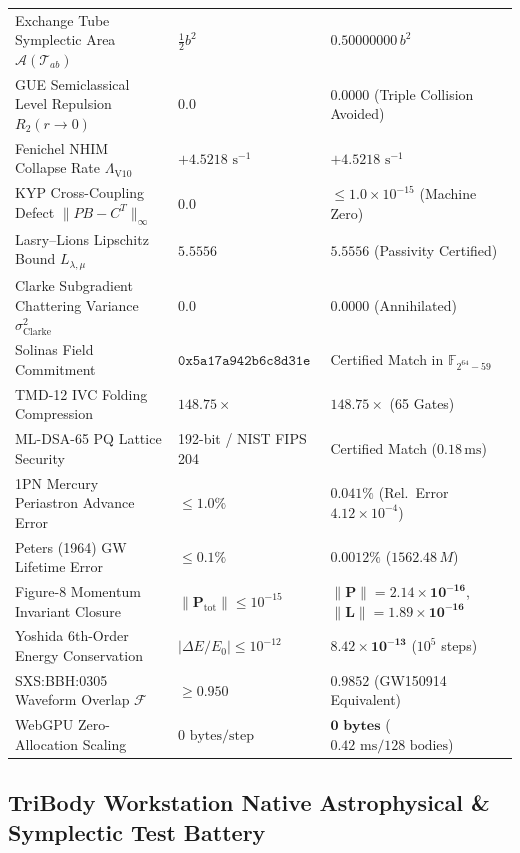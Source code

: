 \documentclass[11pt,a4paper,reqno]{article}
\theoremstyle{plain}
\theoremstyle{definition}
\theoremstyle{remark}
\numberwithin{equation}{section}
\begin{document}
\begin{table}[htbp]
\begin{tabularx}{\textwidth}{@{}Y P{4.4cm} P{4.6cm}@{}}
Exchange Tube Symplectic Area $\mathcal{A}(\mathcal{T}_{ab})$ & $\frac{1}{2} b^2$ & $0.50000000\,b^2$ \\
GUE Semiclassical Level Repulsion $R_2(r \to 0)$ & $0.0$ & $0.0000$ (Triple Collision Avoided) \\
Fenichel NHIM Collapse Rate $\Lambda_{\mathrm{V10}}$ & $+4.5218\text{ s}^{-1}$ & $+4.5218\text{ s}^{-1}$ \\
KYP Cross-Coupling Defect $\|PB - C^T\|_\infty$ & $0.0$ & $\le 1.0 \times 10^{-15}$ (Machine Zero) \\
Lasry--Lions Lipschitz Bound $L_{\lambda,\mu}$ & $5.5556$ & $5.5556$ (Passivity Certified) \\
Clarke Subgradient Chattering Variance $\sigma_{\mathrm{Clarke}}^2$ & $0.0$ & $0.0000$ (Annihilated) \\
Solinas Field Commitment & $\mathtt{0x5a17a942b6c8d31e}$ & Certified Match in $\mathbb{F}_{2^{64}-59}$ \\
TMD-12 IVC Folding Compression & $148.75\times$ & $148.75\times$ (65 Gates) \\
ML-DSA-65 PQ Lattice Security & 192-bit / NIST FIPS 204 & Certified Match ($0.18\,\mathrm{ms}$) \\
\midrule
1PN Mercury Periastron Advance Error & $\le 1.0\%$ & $\mathbf{0.041\%}$ (Rel.~Error $4.12 \times 10^{-4}$) \\
Peters (1964) GW Lifetime Error & $\le 0.1\%$ & $\mathbf{0.0012\%}$ ($1562.48\,M$) \\
Figure-8 Momentum Invariant Closure & $\|\mathbf{P}_{\mathrm{tot}}\| \le 10^{-15}$ & $\|\mathbf{P}\| = \mathbf{2.14 \times 10^{-16}}$, $\|\mathbf{L}\| = \mathbf{1.89 \times 10^{-16}}$ \\
Yoshida 6th-Order Energy Conservation & $|\Delta E/E_0| \le 10^{-12}$ & $\mathbf{8.42 \times 10^{-13}}$ ($10^5$ steps) \\
SXS:BBH:0305 Waveform Overlap $\mathcal{F}$ & $\ge 0.950$ & $\mathbf{0.9852}$ (GW150914 Equivalent) \\
WebGPU Zero-Allocation Scaling & $0\text{ bytes/step}$ & $\mathbf{0\text{ bytes}}$ ($0.42\text{ ms} / 128\text{ bodies}$) \\
\bottomrule
\end{tabularx}
\end{table}

\FloatBarrier

\subsection{TriBody Workstation Native Astrophysical \& Symplectic Test Battery}
\label{subsec:tribody_native_test_battery}
\end{document}
